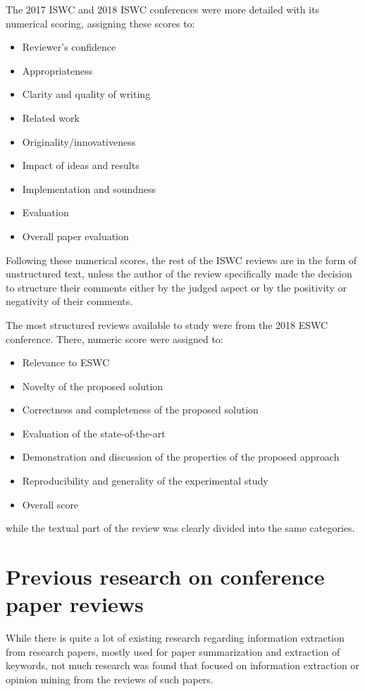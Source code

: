 The 2017 ISWC and 2018 ISWC conferences were more detailed with its numerical scoring, assigning these scores to:
\begin{itemize}
\item Reviewer's confidence
\item Appropriateness
\item Clarity and quality of writing
\item Related work
\item Originality/innovativeness
\item Impact of ideas and results
\item Implementation and soundness
\item Evaluation
\item Overall paper evaluation
\end{itemize}

Following these numerical scores, the rest of the ISWC reviews are in the form of unstructured text, unless the author of the review specifically made the decision to structure their comments either by the judged aspect or by the positivity or negativity of their comments.

The most structured reviews available to study were from the 2018 ESWC conference. There, numeric score were assigned to:
\begin{itemize}
\item Relevance to ESWC
\item Novelty of the proposed solution
\item Correctness and completeness of the proposed solution
\item Evaluation of the state-of-the-art
\item Demonstration and discussion of the properties of the proposed approach
\item Reproducibility and generality of the experimental study
\item Overall score
\end{itemize}

while the textual part of the review was clearly divided into the same categories.
\section{Previous research on conference paper reviews}
While there is quite a lot of existing research regarding information extraction from research papers, mostly used for paper summarization and extraction of keywords, not much research was found that focused on information extraction or opinion mining from the reviews of such papers.

